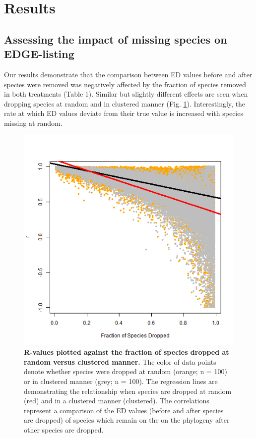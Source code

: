 \documentclass[12pt,english]{article}
\begin{document}
\section*{Results}
\subsection*{Assessing the impact of missing species on EDGE-listing}

Our results demonstrate that the comparison between ED values before and after
species were removed was negatively affected by the fraction of species removed
in both treatments (Table 1). Similar but slightly different effects are seen
when dropping species at random and in clustered manner (Fig.
\ref{randomVsClustered}). Interestingly, the rate at which ED values deviate
from their true value is increased with species missing at random. 

\begin{figure}[!ht]
  \center
  \includegraphics[width=.5\textwidth]{randomVsCluster.png}
  \caption{\textbf{R-values plotted against the fraction of species dropped at
  random versus clustered manner.} The color of data points denote whether
  species were dropped at random (orange; n = 100) or in clustered manner
  (grey; n = 100). The regression lines are demonstrating the relationship when
  species are dropped at random (red) and in a clustered manner (clustered). The
  correlations represent a comparison of the ED values (before and after
  species are dropped) of species which remain on the on the phylogeny after
  other species are dropped. 
  }
  \label{randomVsClustered}
\end{figure}
\end{document}
